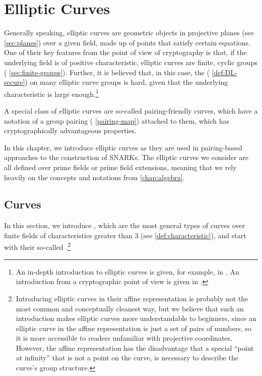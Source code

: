 \chapter{Elliptic Curves}\label{chap:elliptic-curves}
\label{chap:elliptic_curves}
Generally speaking, elliptic curves are geometric objects in projective planes (see \secname{} \ref{sec:planes}) over a given field, made up of points that satisfy certain equations. One of their key features from the point of view of cryptography is that, if the underlying field is of positive characteristic, elliptic curves are finite, cyclic groups (\secname{} \ref{sec:finite-groups}). Further, it is believed that, in this case, the  (\secname{} \ref{def:DL-secure}) on many elliptic curve groups is hard, given that the underlying characteristic is large enough.\footnote{An in-depth introduction to elliptic curves is given, for example, in \cite{silverman-1994}. An introduction from a cryptographic point of view is given in \cite{hoffstein-2008}.}

A special class of elliptic curves are so-called pairing-friendly curves, which have a notation of a group pairing (\secname{} \ref{pairing-map}) attached to them, which has cryptographically advantageous properties. 

In this chapter, we introduce elliptic curves as they are used in pairing-based approaches to the construction of SNARKs. The elliptic curves we consider are all defined over prime fields or prime field extensions, meaning that we rely heavily on the concepts and notations from \chaptname{} \ref{chap:algebra}. 

\section{ Curves}
\label{sec:short_weierstrass_curve}
In this section, we introduce , which are the most general types of curves over finite fields of characteristics greater than $3$ (see \chaptname{} \ref{def:characteristic}), and start with their so-called .\footnote{Introducing elliptic curves in their affine representation is probably not the most common and conceptually cleanest way, but we believe that such an introduction makes elliptic curves more understandable to beginners, since an elliptic curve in the affine representation is just a set of pairs of numbers, so it is more accessible to readers unfamiliar with projective coordinates. However, the affine representation has the disadvantage that a special ``point at infinity'' that is not a point on the curve, is necessary to describe the curve's group structure.}

